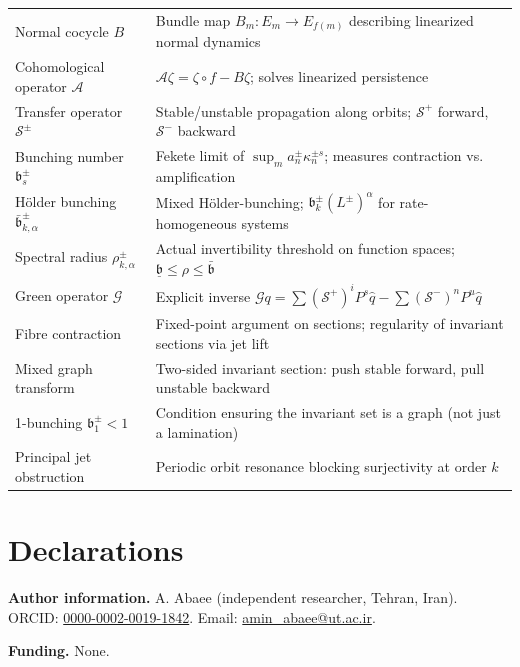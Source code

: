 \documentclass[11pt,a4paper]{article}
\theoremstyle{plain}
\theoremstyle{definition}
\theoremstyle{remark}
\numberwithin{equation}{section}
\numberwithin{figure}{section}
\begin{document}
\begin{tabular}{l|l}
Normal cocycle $B$ & Bundle map $B_m:E_m\to E_{f(m)}$ describing linearized normal dynamics \\
Cohomological operator $\mathcal A$ & $\mathcal A\zeta = \zeta\circ f - B\zeta$; solves linearized persistence \\
Transfer operator $\mathcal S^\pm$ & Stable/unstable propagation along orbits; $\mathcal S^+$ forward, $\mathcal S^-$ backward \\
Bunching number $\mathfrak b^\pm_s$ & Fekete limit of $\sup_m a_n^\pm \kappa_n^{\pm s}$; measures contraction vs. amplification \\
Hölder bunching $\bar{\mathfrak b}^\pm_{k,\alpha}$ & Mixed Hölder-bunching; $\mathfrak b^\pm_k(L^\pm)^\alpha$ for rate-homogeneous systems \\
Spectral radius $\rho^\pm_{k,\alpha}$ & Actual invertibility threshold on function spaces; $\underline{\mathfrak b}\le\rho\le\bar{\mathfrak b}$ \\
Green operator $\mathcal G$ & Explicit inverse $\mathcal Gq=\sum(\mathcal S^+)^iP^s\hat q-\sum(\mathcal S^-)^nP^u\hat q$ \\
Fibre contraction & Fixed-point argument on sections; regularity of invariant sections via jet lift \\
Mixed graph transform & Two-sided invariant section: push stable forward, pull unstable backward \\
1-bunching $\mathfrak b_1^\pm<1$ & Condition ensuring the invariant set is a graph (not just a lamination) \\
Principal jet obstruction & Periodic orbit resonance blocking surjectivity at order $k$ \\
\end{tabular}

\section*{Declarations}

\textbf{Author information.} A. Abaee (independent researcher, Tehran, Iran). ORCID: \href{https://orcid.org/0000-0002-0019-1842}{0000-0002-0019-1842}. Email: \href{mailto:amin_abaee@ut.ac.ir}{amin\_abaee@ut.ac.ir}.

\textbf{Funding.} None.
\end{document}
